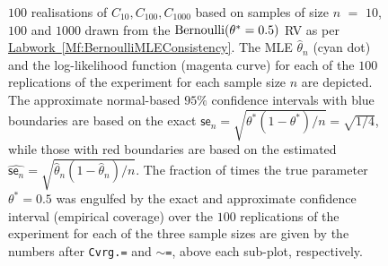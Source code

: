 {\begin{figure}[ht]
\caption{{\small $100$ realisations of $C_{10}, C_{100}, C_{1000}$ based on samples of size $n$ $=$ $10$, $100$ and $1000$ drawn from the $\mbox{{\rm Bernoulli}}(\theta^*=0.5)$ RV as per \hyperref[Mf:BernoulliMLEConsistency]{Labwork~\ref*{Mf:BernoulliMLEConsistency}}.  The MLE $\widehat{\theta}_n$ (cyan dot) and the log-likelihood function (magenta curve) for each of the $100$ replications of the experiment for each sample size $n$ are depicted.  The approximate normal-based $95\%$ confidence intervals with blue boundaries are based on the exact $\mathsf{se}_n=\sqrt{\theta^*(1-\theta^*)/n}=\sqrt{1/4}$, while those with red boundaries are based on the estimated $\widehat{\mathsf{se}_n}=\sqrt{\widehat{\theta}_n(1-\widehat{\theta}_n)/n}$.  The fraction of times the true parameter $\theta^*=0.5$ was engulfed by the exact and approximate confidence interval (empirical coverage) over the $100$ replications of the experiment for each of the three sample sizes are given by the numbers after {\tt Cvrg.=} and {\tt $\sim$=}, above each sub-plot, respectively.}\label{F:BernoulliMLEConsistency}}
\begin{center}
\end{center}
\end{figure}  


}



